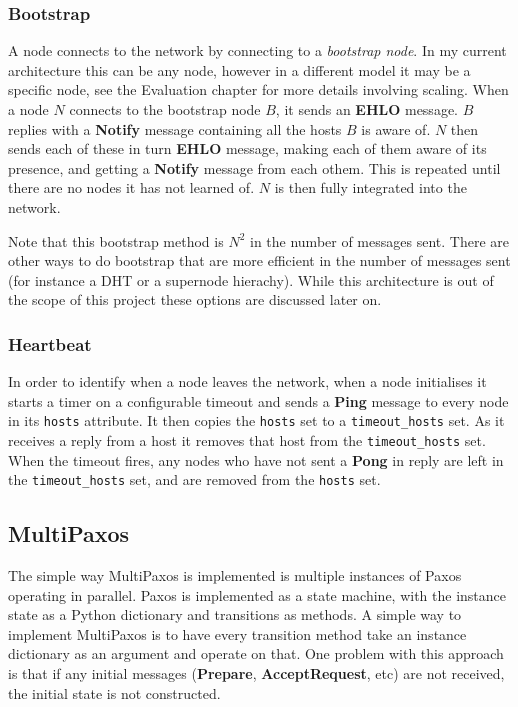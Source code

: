 \documentclass[12pt,twoside,notitlepage]{report}
\newcommand{\msg}[1] {{\bf #1}}         %
\begin{document}

\subsubsection{Bootstrap}

A node connects to the network by connecting to a \emph{bootstrap node}. In my current
architecture this can be any node, however in a different model it may be a specific node, see the
Evaluation chapter for more details involving scaling. When a node $N$ connects to the bootstrap
node $B$, it sends an \msg{EHLO} message. $B$ replies with a \msg{Notify} message containing all the
hosts $B$ is aware of. $N$ then sends each of these in turn \msg{EHLO} message, making each of them
aware of its presence, and getting a \msg{Notify} message from each othem. This is repeated until
there are no nodes it has not learned of. $N$ is then fully integrated into the network.

Note that this bootstrap method is $N^2$ in the number of messages sent. There are other ways to
do bootstrap that are more efficient in the number of messages sent (for instance a DHT or a
supernode hierachy). While this architecture is out of the scope of this project these options are
discussed later on.

\subsubsection{Heartbeat}

In order to identify when a node leaves the network, when a node initialises it starts a timer on
a configurable timeout and sends a \msg{Ping} message to every node in its \verb+hosts+ attribute.
It then copies the \verb+hosts+ set to a \verb+timeout_hosts+ set. As it receives a reply from a
host it removes that host from the \verb+timeout_hosts+ set. When the timeout fires, any nodes who
have not sent a \msg{Pong} in reply are left in the \verb+timeout_hosts+ set, and are removed from
the \verb+hosts+ set.

\subsection{MultiPaxos}

The simple way MultiPaxos is implemented is multiple instances of Paxos operating in parallel.
Paxos is implemented as a state machine, with the instance state as a Python dictionary and
transitions as methods. A simple way to implement MultiPaxos is to have every transition method
take an instance dictionary as an argument and operate on that. One problem with this approach is
that if any initial messages (\msg{Prepare}, \msg{AcceptRequest}, etc) are not received, the
initial state is not constructed.
\end{document}
